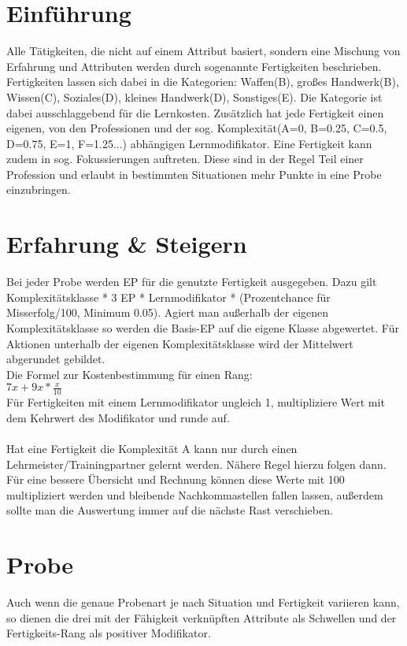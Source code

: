 \documentclass[a4paper,12pt,oneside]{book}
\begin{document}
\section{Einführung}
Alle Tätigkeiten, die nicht auf einem Attribut basiert, sondern eine Mischung von Erfahrung und Attributen werden durch sogenannte Fertigkeiten beschrieben. Fertigkeiten lassen sich dabei in die Kategorien: Waffen(B), großes Handwerk(B), Wissen(C), Soziales(D), kleines Handwerk(D), Sonstiges(E). Die Kategorie ist dabei ausschlaggebend für die Lernkosten. Zusätzlich hat jede Fertigkeit einen eigenen, von den Professionen und der sog. Komplexität(A=0, B=0.25, C=0.5, D=0.75, E=1, F=1.25...) abhängigen Lernmodifikator. Eine Fertigkeit kann zudem in sog. Fokussierungen auftreten. Diese sind in der Regel Teil einer Profession und erlaubt in bestimmten Situationen mehr Punkte in eine Probe einzubringen.
\section{Erfahrung \& Steigern}
Bei jeder Probe werden EP für die genutzte Fertigkeit ausgegeben. Dazu gilt Komplexitätsklasse * 3 EP * Lernmodifikator * (Prozentchance für Misserfolg/100, Minimum 0.05). Agiert man außerhalb der eigenen Komplexitätsklasse so werden die Basis-EP auf die eigene Klasse abgewertet. Für Aktionen unterhalb der eigenen Komplexitätsklasse wird der Mittelwert abgerundet gebildet.
\\Die Formel zur Kostenbestimmung für einen Rang:
\\$7x+9x*\frac{x}{10}$
\\Für Fertigkeiten mit einem Lernmodifikator ungleich 1, multipliziere Wert mit dem Kehrwert des Modifikator und runde auf.
\\
\\Hat eine Fertigkeit die Komplexität A kann nur durch einen Lehrmeister/Trainingpartner gelernt werden. Nähere Regel hierzu folgen dann.
\\Für eine bessere Übersicht und Rechnung können diese Werte mit 100 multipliziert werden und bleibende Nachkommastellen fallen lassen, außerdem sollte man die Auswertung immer auf die nächste Rast verschieben.
\section{Probe}
Auch wenn die genaue Probenart je nach Situation und Fertigkeit variieren kann, so dienen die drei mit der Fähigkeit verknüpften Attribute als Schwellen und der Fertigkeits-Rang als positiver Modifikator.
\end{document}
